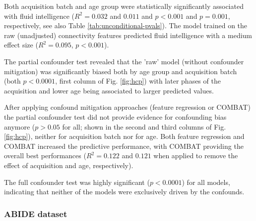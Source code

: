 \documentclass{article}
\begin{document}
Both acquisition batch and age group were statistically significantly associated with fluid intelligence ($R^2=0.032$ and $0.011$ and $p<0.001$ and $p=0.001$, respectively, see also Table \ref{tab:unconditional-pvals}). The model trained on the raw (unadjusted) connectivity features predicted fluid intelligence with a medium effect size ($R^2=0.095$, $p<0.001$).

The partial confounder test revealed that the 'raw' model (without confounder mitigation) was significantly biased both by age group and acquisition batch (both $p<0.0001$, first column of Fig. \ref{fig:hcp}) with later phases of the acquisition and lower age being associated to larger predicted values.

After applying confound mitigation approaches (feature regression or COMBAT) the partial confounder test did not provide evidence for confounding bias anymore ($p > 0.05$ for all; shown in the second and third columns of Fig. \ref{fig:hcp}), neither for acquisition batch nor for age. Both feature regression and COMBAT increased the predictive performance, with COMBAT providing the overall best performances ($R^2=0.122$ and $0.121$ when applied to remove the effect of acquisition and age, respectively).

The full confounder test was highly significant ($p<0.0001$) for all models, indicating that neither of the models were exclusively driven by the confounds.

\subsubsection*{ABIDE dataset}
\end{document}

